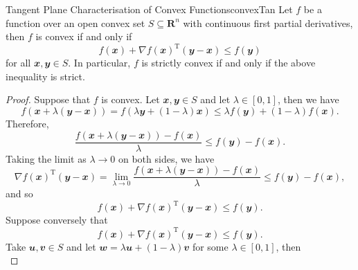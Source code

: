 \documentclass[math, code]{amznotes}
\theoremstyle{remark}
\begin{document}
\begin{probox}{Tangent Plane Characterisation of Convex Functions}{convexTan}
    Let $f$ be a function over an open convex set $S \subseteq \mathbf{R}^n$ with continuous first partial derivatives, then $f$ is convex if and only if 
    \begin{equation*}
        f(\mathbfit{x}) + \nabla f(\mathbfit{x})^{\mathrm{T}}(\mathbfit{y - x}) \leq f(\mathbfit{y})
    \end{equation*}
    for all $\mathbfit{x}, \mathbfit{y} \in S$. In particular, $f$ is strictly convex if and only if the above inequality is strict.
    \tcblower   
    \begin{proof}
        Suppose that $f$ is convex. Let $\mathbfit{x}, \mathbfit{y} \in S$ and let $\lambda \in [0, 1]$, then we have
        \begin{equation*}
            f\left(\mathbfit{x} + \lambda(\mathbfit{y} - \mathbfit{x})\right) = f\left(\lambda\mathbfit{y} + (1 - \lambda)\mathbfit{x}\right) \leq \lambda f(\mathbfit{y}) + (1 - \lambda)f(\mathbfit{x}).
        \end{equation*} 
        Therefore,
        \begin{equation*}
            \frac{f\left(\mathbfit{x} + \lambda(\mathbfit{y} - \mathbfit{x})\right) - f(\mathbfit{x})}{\lambda} \leq f(\mathbfit{y}) - f(\mathbfit{x}).
        \end{equation*}
        Taking the limit as $\lambda \to 0$ on both sides, we have
        \begin{equation*}
            \nabla f(\mathbfit{x})^{\mathrm{T}}(\mathbfit{y - x}) = \lim_{\lambda \to 0}\frac{f\left(\mathbfit{x} + \lambda(\mathbfit{y} - \mathbfit{x})\right) - f(\mathbfit{x})}{\lambda} \leq f(\mathbfit{y}) - f(\mathbfit{x}),
        \end{equation*}
        and so
        \begin{equation*}
            f(\mathbfit{x}) + \nabla f(\mathbfit{x})^{\mathrm{T}}(\mathbfit{y - x}) \leq f(\mathbfit{y}).
        \end{equation*}
        Suppose conversely that 
        \begin{equation*}
            f(\mathbfit{x}) + \nabla f(\mathbfit{x})^{\mathrm{T}}(\mathbfit{y - x}) \leq f(\mathbfit{y}).
        \end{equation*}
        Take $\mathbfit{u}, \mathbfit{v} \in S$ and let $\mathbfit{w} = \lambda\mathbfit{u} + (1 - \lambda)\mathbfit{v}$ for some $\lambda \in [0, 1]$, then
        \begin{displaymath}

\end{displaymath}
\end{proof}
\end{probox}
\end{document}
